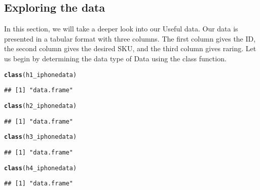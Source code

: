 \documentclass{article}\usepackage[]{graphicx}\usepackage[]{color}
\makeatletter
\newcommand{\hlstd}[1]{\textcolor[rgb]{0.345,0.345,0.345}{#1}}%
\newcommand{\hlkwd}[1]{\textcolor[rgb]{0.737,0.353,0.396}{\textbf{#1}}}%
\newenvironment{kframe}{%
 \def\at@end@of@kframe{}%
 \ifinner\ifhmode%
  \def\at@end@of@kframe{\end{minipage}}%
  \begin{minipage}{\columnwidth}%
 \fi\fi%
 \def\FrameCommand##1{\hskip\@totalleftmargin \hskip-\fboxsep
 \colorbox{shadecolor}{##1}\hskip-\fboxsep
     \hskip-\linewidth \hskip-\@totalleftmargin \hskip\columnwidth}%
 \MakeFramed {\advance\hsize-\width
   \@totalleftmargin\z@ \linewidth\hsize
   \@setminipage}}%
 {\par\unskip\endMakeFramed%
 \at@end@of@kframe}
\newenvironment{knitrout}{}{} %
\makeatother
\begin{document}
\subsection*{Exploring the data}
\par In this section, we will take a deeper look into our Useful data. Our data is
presented in a tabular format with three columns. The first column gives the
ID, the second column gives the desired SKU, and the third
column gives raring.
Let us begin by determining the data type of Data using the class
function.
\begin{knitrout}
\color{fgcolor}\begin{kframe}
\begin{alltt}
\hlkwd{class}\hlstd{(h1_iphonedata)}
\end{alltt}
\begin{verbatim}
## [1] "data.frame"
\end{verbatim}
\begin{alltt}
\hlkwd{class}\hlstd{(h2_iphonedata)}
\end{alltt}
\begin{verbatim}
## [1] "data.frame"
\end{verbatim}
\begin{alltt}
\hlkwd{class}\hlstd{(h3_iphonedata)}
\end{alltt}
\begin{verbatim}
## [1] "data.frame"
\end{verbatim}
\begin{alltt}
\hlkwd{class}\hlstd{(h4_iphonedata)}
\end{alltt}
\begin{verbatim}
## [1] "data.frame"
\end{verbatim}
\end{kframe}
\end{knitrout}
\end{document}
